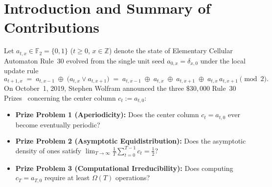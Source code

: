 \documentclass[11pt,a4paper]{article}
\theoremstyle{definition}
\theoremstyle{remark}
\newcommand{\Ftwo}{\mathbb{F}_2}
\newcommand{\Z}{\mathbb{Z}}
\begin{document}
\tableofcontents

\section{Introduction and Summary of Contributions}

Let $a_{t,x} \in \Ftwo = \{0,1\}$ ($t \ge 0$, $x \in \Z$) denote the state of Elementary Cellular Automaton Rule~30 evolved from the single unit seed $a_{0,x} = \delta_{x,0}$ under the local update rule~\cite{Wolfram1983,Wolfram1984,Wolfram2002}
\begin{equation}\label{eq:rule30}
  a_{t+1,x} \;=\; a_{t,x-1} \;\oplus\; \bigl(a_{t,x} \lor a_{t,x+1}\bigr)
  \;=\; a_{t,x-1} \;\oplus\; a_{t,x} \;\oplus\; a_{t,x+1} \;\oplus\; a_{t,x}\,a_{t,x+1} \pmod 2.
\end{equation}
On October~1, 2019, Stephen Wolfram announced the three $\$30{,}000$ Rule~30 Prizes~\cite{Wolfram2019} concerning the center column $c_t := a_{t,0}$:
\begin{itemize}
  \item \textbf{Prize Problem 1 (Aperiodicity):} Does the center column $c_t = a_{t,0}$ ever become eventually periodic?
  \item \textbf{Prize Problem 2 (Asymptotic Equidistribution):} Does the asymptotic density of ones satisfy $\lim_{T\to\infty} \frac{1}{T}\sum_{t=0}^{T-1} c_t = \frac{1}{2}$?
  \item \textbf{Prize Problem 3 (Computational Irreducibility):} Does computing $c_T = a_{T,0}$ require at least $\Omega(T)$ operations?
\end{itemize}
\end{document}
